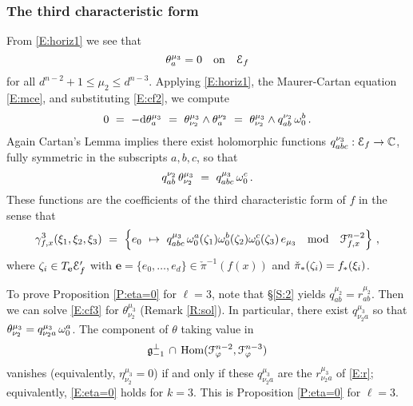 \documentclass[12pt]{amsart}
\numberwithin{equation}{section}
\numberwithin{table}{section}
\numberwithin{figure}{section}
\begin{document}
\subsubsection{The third characteristic form} \label{S:3}

From \eqref{E:horiz1} we see that 
\begin{equation}\label{E:m30}
  \theta^{\mu_3}_a = 0 \quad\hbox{on}\quad \mathcal E_f
\end{equation}
for all $d^{n-2}+1 \le \mu_2 \le d^{n-3}$.  Applying \eqref{E:horiz1}, the Maurer-Cartan equation \eqref{E:mce}, and substituting \eqref{E:cf2}, we compute
\[
  0 \ = \ -\mathrm{d} \theta^{\mu_3}_a 
  \ = \ \theta^{\mu_3}_{\nu_2} \wedge \theta^{\nu_2}_a
  \ = \ \theta^{\mu_3}_{\nu_2} \wedge q^{\nu_2}_{ab}\,\omega^b_0 \,.
\]
Again Cartan's Lemma implies there exist holomorphic functions $q^{\nu_3}_{abc} : \mathcal E_f \to \mathbb C$, fully symmetric in the subscripts $a,b,c$, so that 
\begin{equation}\label{E:cf3}
  q^{\nu_2}_{ab}\, \theta^{\mu_3}_{\nu_2} \ = \ q^{\mu_3}_{abc} \,\omega^c_0 \,.
\end{equation}
These functions are the coefficients of the third characteristic form of $f$ in the sense that 
\begin{equation}\label{E:cf3'}
  \gamma^3_{f,x}(\xi_1,\xi_2,\xi_3) \ = \ 
  \left\{ e_0 \ \mapsto \ 
  q^{\m_3}_{abc} \,\w^a_0(\z_1) \w^b_0(\z_2) \w^c_0(\z_3) \, e_{\m_3} 
  \quad\hbox{mod}\quad \cF_{f,x}^{n-2} \right\} \,,
\end{equation}
where $\zeta_i \in T_\mathbf{e} \mathcal E'_f$ with $\mathbf{e} = \{ e_0 , \ldots , e_d\} \in \check\pi^{-1}(f(x))$ and $\check\pi_*(\zeta_i) = f_*(\xi_i)$.  

To prove Proposition \ref{P:eta=0} for $\ell=3$, note that \S\ref{S:2} yields $q^{\mu_2}_{ab} = r^{\mu_2}_{ab}$.  Then we can solve \eqref{E:cf3} for $\theta^{\mu_3}_{\nu_2}$ (Remark \ref{R:sol}).  In particular, there exist $q^{\mu_3}_{\nu_2a}$ so that $\theta^{\mu_3}_{\nu_2} = q^{\mu_3}_{\nu_2 a} \,\omega^a_0$.  The component of $\theta$ taking value in
\[
  {\mathfrak{g}}^\perp_{-1} \,\cap\, \mathrm{Hom}(\mathcal F^{n-2}_\varphi,\mathcal F^{n-3}_\varphi)
\]
vanishes (equivalently, $\eta^{\mu_3}_{\nu_2}=0$) if and only if these $q^{\mu_3}_{\nu_2a}$ are the $r^{\mu_3}_{\nu_2a}$ of \eqref{E:r}; equivalently, \eqref{E:eta=0} holds for $k=3$.  This is Proposition \ref{P:eta=0} for $\ell=3$.

\end{document}
